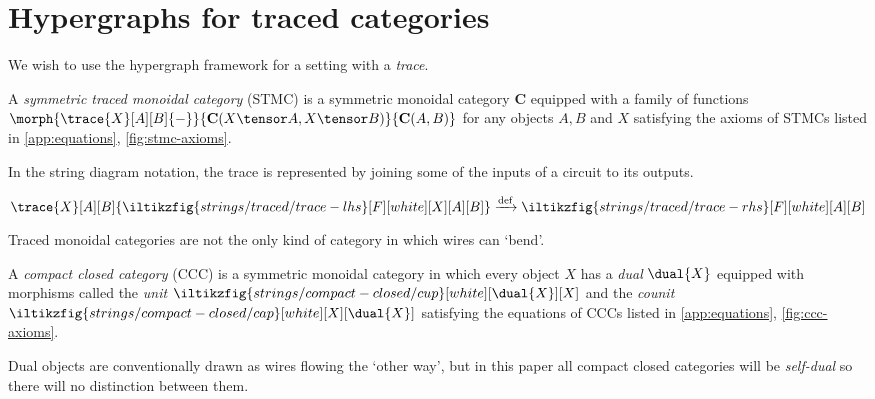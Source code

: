 \section{Hypergraphs for traced categories}

We wish to use the hypergraph framework for a setting with a \emph{trace}.

\begin{definition}
    A \emph{symmetric traced monoidal category} (STMC) is a symmetric monoidal
    category \(\mathbf{C}\) equipped with a family of functions \(
        \morph{
            \trace{X}[A][B]{-}
        }{
            \mathbf{C}(X \tensor A, X \tensor B)
        }{
            \mathbf{C}(A, B)
        }
    \) for any objects \(A,B\) and \(X\) satisfying the axioms of STMCs listed
    in \cref{app:equations}, \cref{fig:stmc-axioms}.
\end{definition}

In the string diagram notation, the trace is represented by joining some of the
inputs of a circuit to its outputs.
%
\begin{center}
    \(
        \trace{X}[A][B]{\iltikzfig{strings/traced/trace-lhs}[F][white][X][A][B]}
        \xrightarrow{\text{def}}
        \iltikzfig{strings/traced/trace-rhs}[F][white][A][B]
    \)
\end{center}

Traced monoidal categories are not the only kind of category in which wires can
`bend'.

\begin{definition}
    A \emph{compact closed category} (CCC) is a symmetric monoidal category in
    which every object \(X\) has a \emph{dual} \(\dual{X}\) equipped with
    morphisms called the \emph{unit} \(
        \iltikzfig{strings/compact-closed/cup}[white][\dual{X}][X]
    \) and the \emph{counit} \(
        \iltikzfig{strings/compact-closed/cap}[white][X][\dual{X}]
    \) satisfying the equations of CCCs listed in \cref{app:equations},
    \cref{fig:ccc-axioms}.
\end{definition}

Dual objects are conventionally drawn as wires flowing the `other way', but in
this paper all compact closed categories will be \emph{self-dual} so there will
no distinction between them.

